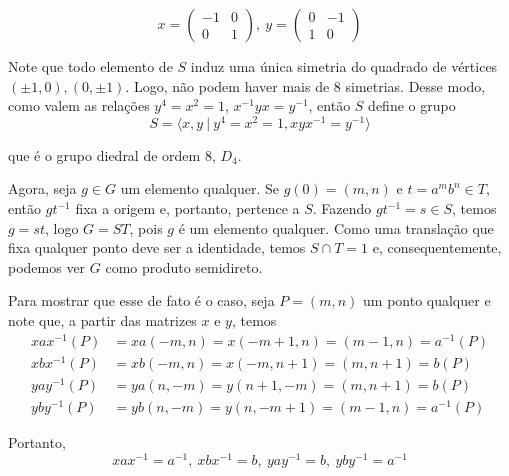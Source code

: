 \documentclass[a4paper,portuguese,11pt,twoside, leqno]{book}
\theoremstyle{definition}
\begin{document}
	\begin{equation*}
	x = \begin{pmatrix}
	-1 & 0 \\
	0 & 1
	\end{pmatrix}, \ y = \begin{pmatrix}
	0 & -1 \\
	1 & 0 
	\end{pmatrix}
	\end{equation*} 
	\par\vspace{0.3cm} Note que todo elemento de $S$ induz uma única simetria do quadrado de vértices $(\pm1, 0), (0,\pm1)$. Logo, não podem haver mais de $8$ simetrias. Desse modo, como valem as relações $y^4=x^2=1$, $x^{-1}yx = y^{-1}$, então $S$ define o grupo
	\begin{equation*}
	S = \langle x,y \ | \ y^4=x^2=1, xyx^{-1}=y^{-1} \rangle
	\end{equation*} 
	\par\vspace{0.3cm} que é o grupo diedral de ordem $8$, $D_4$.
	\par\vspace{0.3cm} Agora, seja $g\in G$ um elemento qualquer. Se $g(0) = (m,n)$ e $t = a^mb^n\in T$, então $gt^{-1}$ fixa a origem e, portanto, pertence a $S$. Fazendo $gt^{-1} = s\in S$, temos $g = st$, logo $G = ST$, pois $g$ é um elemento qualquer. Como uma translação que fixa qualquer ponto deve ser a identidade, temos $S\cap T = 1$ e, consequentemente, podemos ver $G$ como produto semidireto.
	\par\vspace{0.3cm} Para mostrar que esse de fato é o caso, seja $P = (m,n)$ um ponto qualquer e note que, a partir das matrizes $x$ e $y$, temos
	\begin{align*}
	xax^{-1}(P) &= xa(-m,n) = x(-m+1, n) = (m-1, n) = a^{-1}(P) \\
	xbx^{-1}(P) &= xb(-m,n) = x(-m, n+1) = (m, n+1) = b(P) \\
	yay^{-1}(P) &= ya(n,-m) = y(n+1,-m) = (m, n+1) = b(P) \\
	yby^{-1}(P) &= yb(n,-m) = y(n,-m+1) = (m-1,n) = a^{-1}(P)
	\end{align*}
	\par\vspace{0.3cm} Portanto, 
	\begin{equation}
	xax^{-1} = a^{-1}, \ xbx^{-1} = b, \ yay^{-1} = b, \ yby^{-1} = a^{-1}
	\label{normaliza}
	\end{equation}
\end{document}
